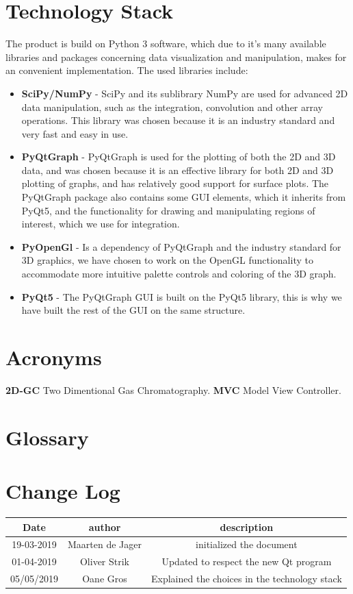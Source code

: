 \documentclass{article}
\begin{document}
\section*{Technology Stack}
The product is build on Python 3 software, which due to it's many available libraries and packages concerning data visualization and manipulation, makes for an convenient implementation. The used libraries include:

\begin{itemize}
    \item \textbf{SciPy/NumPy} - SciPy and its sublibrary NumPy are used for advanced 2D data manipulation, such as the integration, convolution and other array operations. This library was chosen because it is an industry standard and very fast and easy in use. 
    \item \textbf{PyQtGraph} - PyQtGraph is used for the plotting of both the 2D and 3D data, and was chosen because it is an effective library for both 2D and 3D plotting of graphs, and has relatively good support for surface plots. The PyQtGraph package also contains some GUI elements, which it inherits from PyQt5, and the functionality for drawing and manipulating regions of interest, which we use for integration.
    \item \textbf{PyOpenGl} - Is a dependency of PyQtGraph and the industry standard for 3D graphics, we have chosen to work on the OpenGL functionality to accommodate more intuitive palette controls and coloring of the 3D graph.
    \item \textbf{PyQt5} - The PyQtGraph GUI is built on the PyQt5 library, this is why we have built the rest of the GUI on the same structure.
\end{itemize}

\section*{Acronyms}

\textbf{2D-GC} Two Dimentional Gas Chromatography.
\textbf{MVC} Model View Controller.

\section*{Glossary}


\section*{Change Log}

\begin{tabular}{|c|c|c|}
     \hline
     Date& author & description \\
     \hline
     19-03-2019 & Maarten de Jager & initialized the document \\
     \hline
     01-04-2019 & Oliver Strik & Updated to respect the new Qt program \\
     \hline
     05/05/2019 & Oane Gros & Explained the choices in the technology stack \\
     \hline
\end{tabular}
\end{document}
